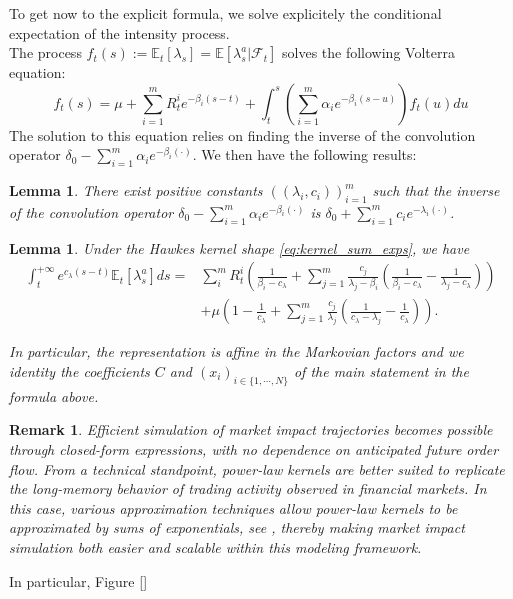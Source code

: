 \documentclass{article} %
\newtheorem{lemma}[theorem]{Lemma}
\newtheorem{remark}[theorem]{Remark}
\newcommand{\1}{\mathbbm{1}} %
\newcommand{\E}{\mathbb{E}}
\begin{document}
\begin{as}
 To get now to the explicit formula, we solve explicitely the conditional expectation of the intensity process. \\
 The process $f_t(s) := \E_t[\lambda_s] = \E[\lambda^a_s|\mathcal{F}_t] $ solves the following Volterra equation:
    \begin{equation}
    f_t(s) = \mu + \sum_{i=1}^m R^i_t e^{-\beta_i (s-t)} + \int_t^s \left(\sum_{i=1}^m \alpha_i e^{-\beta_i(s-u)}\right) f_t(u) du
    \end{equation}
    The solution to this equation relies on finding the inverse of the convolution operator $\delta_0 - \sum_{i=1}^m \alpha_i e^{-\beta_i (\cdot)}$. We then have the following results:
\begin{lemma}
    \label{lem:propagator_formula}
    There exist positive constants $((\lambda_i, c_i))_{i=1}^m$ such that the inverse of the convolution operator $\delta_0 - \sum_{i=1}^m \alpha_i e^{-\beta_i (\cdot)}$ is $\delta_0 + \sum_{i=1}^m c_i e^{-\lambda_i (\cdot)}$.
\end{lemma}
\begin{lemma}
    \label{lem:closed_impact_term}
    Under the Hawkes kernel shape \eqref{eq:kernel_sum_exps}, we have
    \begin{align*}
    \int_{t}^{+\infty} e^{c_{\lambda}(s-t)} \E_t[\lambda^a_s]ds = &\sum_{i}^{m} R^i_t \left( \frac{1}{ \beta_i - c_{\lambda}} + \sum_{j=1}^m \frac{c_j}{\lambda_j - \beta_i}\left(\frac{1}{\beta_i - c_\lambda} - \frac{1}{\lambda_j - c_\lambda}\right)\right) \\
    &+ \mu \left(1 -  \frac{1}{c_\lambda} + \sum_{j=1}^m \frac{c_j}{\lambda_j} \left(\frac{1}{c_\lambda - \lambda_j} - \frac{1}{c_\lambda}\right)\right).
    \end{align*}
    
    In particular, the representation is affine in the Markovian factors and we identity the coefficients $C$ and $(x_i)_{i \in \{ 1, \cdots, N\}}$ of the main statement in the formula above.
\end{lemma}
\begin{remark}
    Efficient simulation of market impact trajectories becomes possible through closed-form expressions, with no dependence on anticipated future order flow. From a technical standpoint, power-law kernels are better suited to replicate the long-memory behavior of trading activity observed in financial markets. In this case, various approximation techniques allow power-law kernels to be approximated by sums of exponentials, see \cite[]{}, thereby making market impact simulation both easier and scalable within this modeling framework.
\end{remark} 
In particular, Figure \ref{} 


\end{as}
\end{document}

